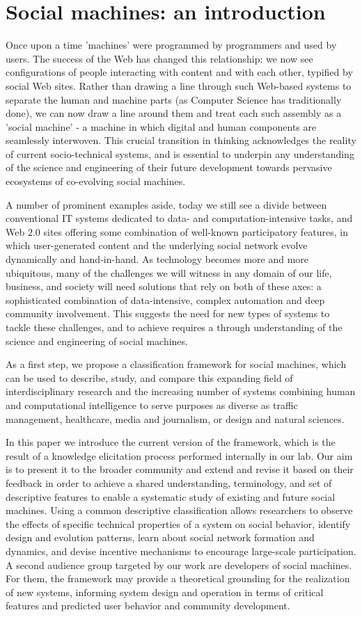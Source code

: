 \documentclass{sig-alternate}
\begin{document}
\section{Social machines: an introduction}
Once upon a time 'machines' were programmed by programmers and used by users. The success of the Web has changed this relationship: we now see configurations of people interacting with content and with each other, typified by social Web sites. Rather than drawing a line through such Web-based systems to separate the human and machine parts (as Computer Science has traditionally done), we can now draw a line around them  and  treat  each  such  assembly  as  a  'social  machine'  -  a  machine  in which  digital  and  human components are seamlessly interwoven. This crucial transition in thinking acknowledges the reality of current socio-technical systems, and is essential to underpin any understanding of the science and engineering of their future development towards pervasive ecosystems of co-evolving social machines.

A number of prominent examples aside, today we still see a divide between conventional IT systems dedicated to data- and computation-intensive tasks, and Web $2.0$ sites offering some combination of well-known participatory features, in which user-generated content and the underlying social network evolve dynamically and hand-in-hand. As technology becomes more and more ubiquitous, many of the challenges we will witness in any domain of our life, business, and society will need solutions that rely on both of these axes: a sophisticated  combination  of  data-intensive, complex automation and deep community involvement. This suggests the need for new types of systems to tackle these challenges, and to achieve requires a through understanding of the science and engineering of social machines.

As a first step, we propose a classification framework for social machines, which can be used to describe, study, and compare this expanding field of interdisciplinary research and the increasing number of systems combining human and computational intelligence to serve purposes as diverse as traffic management, healthcare, media and journalism, or design and natural sciences.

In this paper we introduce the current version of the framework, which is the result of a knowledge elicitation process performed internally in our lab. Our aim is to present it to the broader community and extend and revise it based on their feedback in order to achieve a shared understanding, terminology, and set of descriptive features to enable a systematic study of existing and future social machines. Using a common descriptive classification allows researchers to observe the effects of specific technical properties of a system on social behavior, identify design and evolution patterns, learn about social network formation and dynamics, and devise incentive mechanisms to encourage large-scale participation. A second audience group targeted by our work are developers of social machines. For them, the framework may provide a theoretical grounding for the realization of new systems, informing system design and operation in terms of critical features and predicted user behavior and community development.
\end{document}
